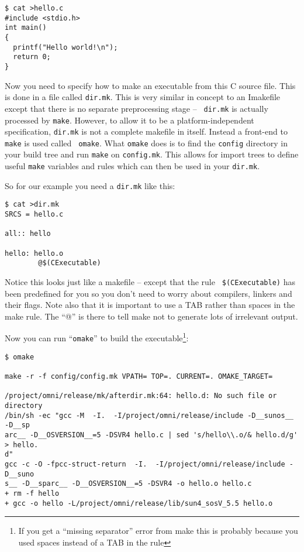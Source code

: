 \documentclass[11pt,twoside,onecolumn]{article}
\begin{document}
{\small \begin{verbatim}
$ cat >hello.c
#include <stdio.h>
int main()
{
  printf("Hello world!\n");
  return 0;
}
\end{verbatim}}

Now you need to specify how to make an executable from this C source file.
This is done in a file called {\tt dir.mk}.  This is very similar in concept to
an Imakefile except that there is no separate preprocessing stage -- {\tt
dir.mk} is actually processed by {\tt make}.  However, to allow it to be a
platform-independent specification, {\tt dir.mk} is not a complete
makefile in itself.  Instead a front-end to {\tt make} is used called {\tt
omake}.  What {\tt omake} does is to find the {\tt config} directory in your
build tree and run {\tt make} on {\tt config.mk}.  This allows for import trees
to define useful {\tt make} variables and rules which can then be used in your
{\tt dir.mk}.

So for our example you need a {\tt dir.mk} like this:

{\small \begin{verbatim}
$ cat >dir.mk
SRCS = hello.c

all:: hello

hello: hello.o
        @$(CExecutable)
\end{verbatim}}

Notice this looks just like a makefile -- except that the rule {\tt
\$(CExecutable)} has been predefined for you so you don't need to worry about
compilers, linkers and their flags.  Note also that it is important to use a
TAB rather than spaces in the make rule.  The ``@'' is there to tell make not
to generate lots of irrelevant output.

Now you can run ``{\tt omake}'' to build the executable\footnote{If you get a
``missing separator'' error from make this is probably because you used spaces
instead of a TAB in the rule}:

{\small \begin{verbatim}
$ omake

make -r -f config/config.mk VPATH= TOP=. CURRENT=. OMAKE_TARGET=

/project/omni/release/mk/afterdir.mk:64: hello.d: No such file or directory
/bin/sh -ec "gcc -M  -I.  -I/project/omni/release/include -D__sunos__ -D__sp
arc__ -D__OSVERSION__=5 -DSVR4 hello.c | sed 's/hello\\.o/& hello.d/g' > hello.
d"
gcc -c -O -fpcc-struct-return  -I.  -I/project/omni/release/include -D__suno
s__ -D__sparc__ -D__OSVERSION__=5 -DSVR4 -o hello.o hello.c
+ rm -f hello 
+ gcc -o hello -L/project/omni/release/lib/sun4_sosV_5.5 hello.o 
\end{verbatim}}
\end{document}
